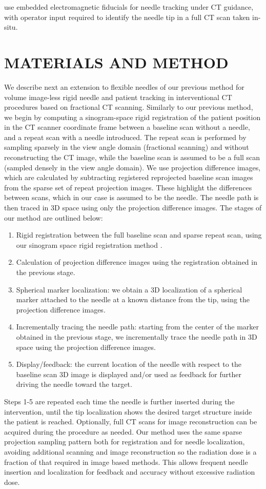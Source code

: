 \documentclass[letterpaper, 10 pt, conference]{ieeeconf}  %
\begin{document}
\cite{yaniv2010needle} use embedded electromagnetic fiducials for needle tracking under CT guidance, with operator input required to identify the needle tip in a full CT scan taken in-situ.

\section{MATERIALS AND METHOD}

We describe next an extension to flexible needles of our previous method \cite{medan2017reduced} for volume image-less rigid needle and patient tracking in interventional CT procedures based on fractional CT scanning. Similarly to our previous method, we begin by computing a sinogram-space rigid registration of the patient position in the CT scanner coordinate frame between a baseline scan without a needle, and a repeat scan with a needle introduced. The repeat scan is performed by sampling sparsely in the view angle domain (fractional scanning) and without reconstructing the CT image, while the baseline scan is assumed to be a full scan (sampled densely in the view angle domain). We use projection difference images, which are calculated by subtracting registered reprojected baseline scan images from the sparse set of repeat projection images. These highlight the differences between scans, which in our case is assumed to be the needle. The needle path is then traced in 3D space using only the projection difference images. The stages of our method are outlined below:
\begin{enumerate}
\item Rigid registration between the full baseline scan and sparse repeat scan, using our sinogram space rigid registration method \cite{medan2017sparse}.
\item Calculation of projection difference images using the registration obtained in the previous stage.
\item Spherical marker localization: we obtain a 3D localization of a spherical marker attached to the needle at a known distance from the tip, using the projection difference images.
\item Incrementally tracing the needle path: starting from the center of the marker obtained in the previous stage, we incrementally trace the needle path in 3D space using the projection difference images.
\item Display/feedback: the current location of the needle with respect to the baseline scan 3D image is displayed and/or used as feedback for further driving the needle toward the target.
\end{enumerate}
Steps 1-5 are repeated each time the needle is further inserted during the intervention, until the tip localization shows the desired target structure inside the patient is reached. Optionally, full CT scans for image reconstruction can be acquired during the procedure as needed. Our method uses the same sparse projection sampling pattern both for registration and for needle localization, avoiding additional scanning and image reconstruction so the radiation dose is a fraction of that required in image based methods. This allows frequent needle insertion and localization for feedback and accuracy without excessive radiation dose.
\end{document}

